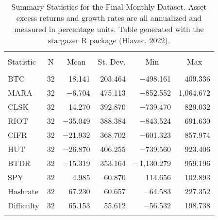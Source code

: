 
\begin{table}[!htbp] \centering 
  \caption{Summary Statistics for the Final Monthly Dataset. Asset excess returns and growth rates are all annualized and measured in percentage units. Table generated with the stargazer R package (Hlavac, 2022).} 
  \label{SummaryStats_excess} 
\large 
\begin{tabular}{@{\extracolsep{5pt}}lrrrrr} 
\\[-1.8ex]\hline 
\hline \\[-1.8ex] 
Statistic & \multicolumn{1}{c}{N} & \multicolumn{1}{c}{Mean} & \multicolumn{1}{c}{St. Dev.} & \multicolumn{1}{c}{Min} & \multicolumn{1}{c}{Max} \\ 
\hline \\[-1.8ex] 
BTC & 32 & 18.141 & 203.464 & $-$498.161 & 409.336 \\ 
MARA & 32 & $-$6.704 & 475.113 & $-$852.552 & 1,064.672 \\ 
CLSK & 32 & 14.270 & 392.870 & $-$739.470 & 829.032 \\ 
RIOT & 32 & $-$35.049 & 388.384 & $-$843.524 & 691.630 \\ 
CIFR & 32 & $-$21.932 & 368.702 & $-$601.323 & 857.974 \\ 
HUT & 32 & $-$26.870 & 406.255 & $-$739.560 & 923.406 \\ 
BTDR & 32 & $-$15.319 & 353.164 & $-$1,130.279 & 959.196 \\ 
SPY & 32 & 4.985 & 60.870 & $-$114.656 & 102.893 \\ 
Hashrate & 32 & 67.230 & 60.657 & $-$64.583 & 227.352 \\ 
Difficulty & 32 & 65.153 & 55.612 & $-$56.532 & 198.738 \\ 
\hline \\[-1.8ex] 
\end{tabular} 
\end{table} 
